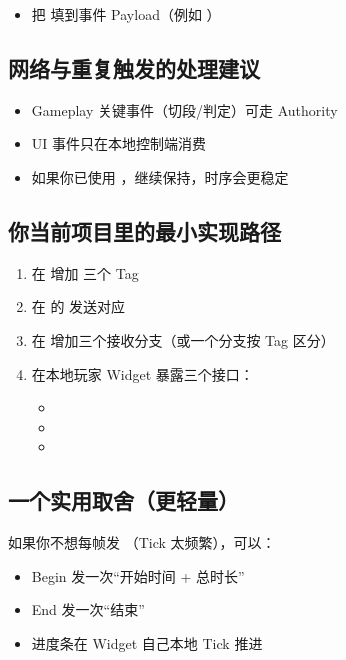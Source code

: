 \begin{itemize}
	\item 把  填到事件 Payload（例如 ）
\end{itemize}

\subsection{网络与重复触发的处理建议}

\begin{itemize}
	\item Gameplay 关键事件（切段/判定）可走 Authority
	\item UI 事件只在本地控制端消费
	\item 如果你已使用 ，继续保持，时序会更稳定
\end{itemize}

\subsection{你当前项目里的最小实现路径}

\begin{enumerate}
	\item 在  增加  三个 Tag
	\item 在  的  发送对应 
	\item 在  增加三个接收分支（或一个分支按 Tag 区分）
	\item 在本地玩家 Widget 暴露三个接口：
	\begin{itemize}
		\item {}
		\item {}
		\item {}
	\end{itemize}
\end{enumerate}

\subsection{一个实用取舍（更轻量）}

如果你不想每帧发 （Tick 太频繁），可以：

\begin{itemize}
	\item Begin 发一次“开始时间 + 总时长”
	\item End 发一次“结束”
	\item 进度条在 Widget 自己本地 Tick 推进
\end{itemize}

